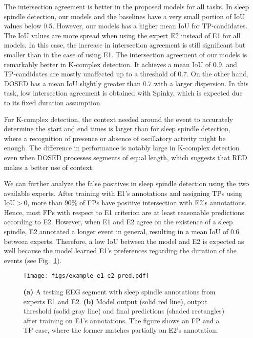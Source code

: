 \documentclass[conference]{IEEEtran}
\begin{document}
The intersection agreement is better in the proposed models for all tasks. In sleep spindle detection, our models and the baselines have a very small portion of IoU values below 0.5. However, our models has a higher mean IoU for TP-candidates. The IoU values are more spread when using the expert E2 instead of E1 for all models. In this case, the increase in intersection agreement is still significant but smaller than in the case of using E1. The intersection agreement of our models is remarkably better in K-complex detection. It achieves a mean IoU of 0.9, and TP-candidates are mostly unaffected up to a threshold of 0.7. On the other hand, DOSED has a mean IoU slightly greater than 0.7 with a larger dispersion. In this task, low intersection agreement is obtained with Spinky, which is expected due to its fixed duration assumption.

For K-complex detection, the context needed around the event to accurately determine the start and end times is larger than for sleep spindle detection, where a recognition of presence or absence of oscillatory activity might be enough. The difference in performance is notably large in K-complex detection even when DOSED processes segments of equal length, which suggests that RED makes a better use of context.

We can further analyze the false positives in sleep spindle detection using the two available experts. After training with E1's annotations and assigning TPs using $\text{IoU}>0$, more than 90\% of FPs have positive intersection with E2's annotations. Hence, most FPs with respect to E1 criterion are at least reasonable predictions according to E2. However, when E1 and E2 agree on the existence of a sleep spindle, E2 annotated a longer event in general, resulting in a mean IoU of 0.6 between experts. Therefore, a low IoU between the model and E2 is expected as well because the model learned E1's preferences regarding the duration of the events (see Fig.~\ref{fig:example_e1_e2_pred}).

\begin{figure}[tbp]
\centering \texttt{[image: figs/example\_e1\_e2\_pred.pdf]}
\caption{
\textbf{(a)} A testing EEG segment with sleep spindle annotations from experts E1 and E2. \textbf{(b)} Model output (solid red line), output threshold (solid gray line) and final predictions (shaded rectangles) after training on E1's annotations. The figure shows an FP and a TP case, where the former matches partially an E2's annotation.
}
\label{fig:example_e1_e2_pred}
\end{figure}
\end{document}
